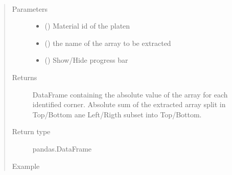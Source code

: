 \documentclass[letterpaper,10pt,english]{sphinxmanual}
\begin{document}
\begin{fulllineitems}
\begin{fulllineitems}
\label{\detokenize{openfdem:openfdem.openfdem.Model.rotary_shear_calculation}}~\begin{quote}\begin{description}
\item[{Parameters}] \leavevmode\begin{itemize}
\item {} 
 () \textendash{} Material id of the platen

\item {} 
 () \textendash{} the name of the array to be extracted

\item {} 
 () \textendash{} Show/Hide progress bar

\end{itemize}

\item[{Returns}] \leavevmode
DataFrame containing the absolute value of the array for each identified corner. Absolute sum of the extracted array split in Top/Bottom ane Left/Rigth sub\sphinxhyphen{}set into Top/Bottom.

\item[{Return type}] \leavevmode
pandas.DataFrame

\item[{Example}] \leavevmode
\end{description}\end{quote}


\end{fulllineitems}
\end{fulllineitems}
\end{document}
